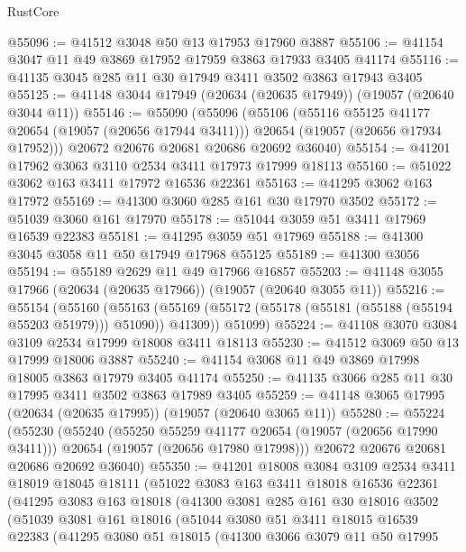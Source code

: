 \begin{lexlean}{RustCore}
\begin{coremodule}
@55096 := @41512 @3048 @50 @13 @17953 @17960 @3887
@55106 := @41154 @3047 @11 @49 @3869 @17952 @17959 @3863 @17933 @3405 @41174
@55116 := @41135 @3045 @285 @11 @30 @17949 @3411 @3502 @3863 @17943 @3405
@55125 := @41148 @3044 @17949 (@20634 (@20635 @17949)) (@19057 (@20640 @3044 @11))
@55146 := @55090
    (@55096
      (@55106
        (@55116 @55125 @41177 @20654 (@19057 (@20656 @17944 @3411)))
        @20654
        (@19057 (@20656 @17934 @17952)))
      @20672
      @20676
      @20681
      @20686
      @20692
      @36040)
@55154 := @41201 @17962 @3063 @3110 @2534 @3411 @17973 @17999 @18113
@55160 := @51022 @3062 @163 @3411 @17972 @16536 @22361
@55163 := @41295 @3062 @163 @17972
@55169 := @41300 @3060 @285 @161 @30 @17970 @3502
@55172 := @51039 @3060 @161 @17970
@55178 := @51044 @3059 @51 @3411 @17969 @16539 @22383
@55181 := @41295 @3059 @51 @17969
@55188 := @41300 @3045 @3058 @11 @50 @17949 @17968 @55125
@55189 := @41300 @3056
@55194 := @55189 @2629 @11 @49 @17966 @16857
@55203 := @41148 @3055 @17966 (@20634 (@20635 @17966)) (@19057 (@20640 @3055 @11))
@55216 := @55154
    (@55160
      (@55163 (@55169 (@55172 (@55178 (@55181 (@55188 (@55194 @55203 @51979))) @51090)) @41309))
      @51099)
@55224 := @41108 @3070 @3084 @3109 @2534 @17999 @18008 @3411 @18113
@55230 := @41512 @3069 @50 @13 @17999 @18006 @3887
@55240 := @41154 @3068 @11 @49 @3869 @17998 @18005 @3863 @17979 @3405 @41174
@55250 := @41135 @3066 @285 @11 @30 @17995 @3411 @3502 @3863 @17989 @3405
@55259 := @41148 @3065 @17995 (@20634 (@20635 @17995)) (@19057 (@20640 @3065 @11))
@55280 := @55224
    (@55230
      (@55240
        (@55250 @55259 @41177 @20654 (@19057 (@20656 @17990 @3411)))
        @20654
        (@19057 (@20656 @17980 @17998)))
      @20672
      @20676
      @20681
      @20686
      @20692
      @36040)
@55350 := @41201
    @18008
    @3084
    @3109
    @2534
    @3411
    @18019
    @18045
    @18111
    (@51022
      @3083
      @163
      @3411
      @18018
      @16536
      @22361
      (@41295
        @3083
        @163
        @18018
        (@41300
          @3081
          @285
          @161
          @30
          @18016
          @3502
          (@51039
            @3081
            @161
            @18016
            (@51044
              @3080
              @51
              @3411
              @18015
              @16539
              @22383
              (@41295
                @3080
                @51
                @18015
                (@41300
                  @3066
                  @3079
                  @11
                  @50
                  @17995

\end{coremodule}
\end{lexlean}
